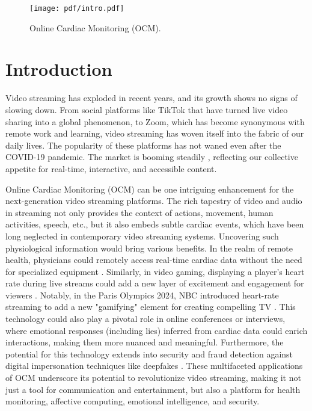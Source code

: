 \begin{figure}[t]
    \centering
    \texttt{[image: pdf/intro.pdf]}
    \caption{Online Cardiac Monitoring (OCM).}
    \label{fig:intro}
\end{figure}

\section{Introduction}

Video streaming has exploded in recent years, and its growth shows no signs of slowing down. From social platforms like TikTok that have turned live video sharing into a global phenomenon, to Zoom, which has become synonymous with remote work and learning, video streaming has woven itself into the fabric of our daily lives. The popularity of these platforms has not waned even after the COVID-19 pandemic. The market is booming steadily \cite{VideoStreamingSVoD}, reflecting our collective appetite for real-time, interactive, and accessible content.

Online Cardiac Monitoring (OCM) can be one intriguing enhancement for the next-generation video streaming platforms. 
The rich tapestry of video and audio in streaming not only provides the context of actions, movement, human activities, speech, etc., but it also embeds subtle cardiac events, which have been long neglected in contemporary video streaming systems. 
Uncovering such physiological information would bring various benefits. In the realm of remote health, physicians could remotely access real-time cardiac data without the need for specialized equipment \cite{HeartDiseaseSymptoms}. Similarly, in video gaming, displaying a player's heart rate during live streams could add a new layer of excitement and engagement for viewers \cite{PulsoidRealtimeHearta}. 
Notably, in the Paris Olympics 2024, NBC introduced heart-rate streaming to add a new "gamifying" element for creating compelling TV \cite{Paris2024Parents}. 
This technology could also play a pivotal role in online conferences or interviews, where emotional responses (including lies) inferred from cardiac data \cite{wang2020you, sun2022estimating} could enrich interactions, making them more nuanced and meaningful. 
Furthermore, the potential for this technology extends into security and fraud detection against digital impersonation techniques like deepfakes \cite{liu2019cardiocam, qi2020deeprhythm}. 
These multifaceted applications of OCM underscore its potential to revolutionize video streaming, making it not just a tool for communication and entertainment, but also a platform for health monitoring, affective computing, emotional intelligence, and security.


